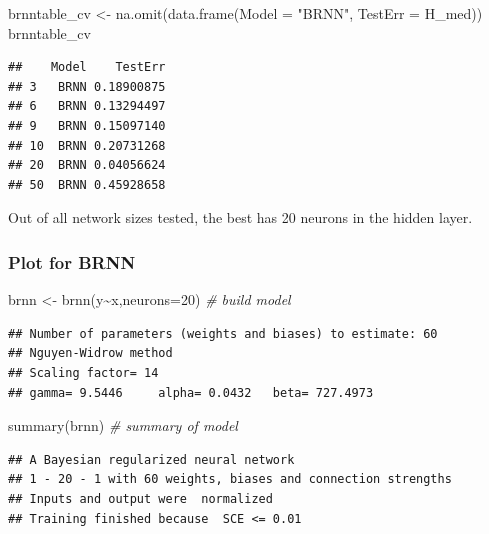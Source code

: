 \documentclass[
]{article}
\newenvironment{Shaded}{\begin{snugshade}}{\end{snugshade}}
\newcommand{\AttributeTok}[1]{\textcolor[rgb]{0.77,0.63,0.00}{#1}}
\newcommand{\CommentTok}[1]{\textcolor[rgb]{0.56,0.35,0.01}{\textit{#1}}}
\newcommand{\DecValTok}[1]{\textcolor[rgb]{0.00,0.00,0.81}{#1}}
\newcommand{\FunctionTok}[1]{\textcolor[rgb]{0.00,0.00,0.00}{#1}}
\newcommand{\NormalTok}[1]{#1}
\newcommand{\OtherTok}[1]{\textcolor[rgb]{0.56,0.35,0.01}{#1}}
\newcommand{\SpecialCharTok}[1]{\textcolor[rgb]{0.00,0.00,0.00}{#1}}
\newcommand{\StringTok}[1]{\textcolor[rgb]{0.31,0.60,0.02}{#1}}
\begin{document}
\begin{Shaded}
\begin{Highlighting}[]
\NormalTok{brnntable\_cv }\OtherTok{\textless{}{-}} \FunctionTok{na.omit}\NormalTok{(}\FunctionTok{data.frame}\NormalTok{(}\AttributeTok{Model =} \StringTok{"BRNN"}\NormalTok{, }\AttributeTok{TestErr =}\NormalTok{ H\_med))}
\NormalTok{brnntable\_cv}
\end{Highlighting}
\end{Shaded}

\begin{verbatim}
##    Model    TestErr
## 3   BRNN 0.18900875
## 6   BRNN 0.13294497
## 9   BRNN 0.15097140
## 10  BRNN 0.20731268
## 20  BRNN 0.04056624
## 50  BRNN 0.45928658
\end{verbatim}

Out of all network sizes tested, the best has 20 neurons in the hidden
layer.

\hypertarget{plot-for-brnn}{%
\subsubsection{Plot for BRNN}\label{plot-for-brnn}}

\begin{Shaded}
\begin{Highlighting}[]
\NormalTok{brnn }\OtherTok{\textless{}{-}} \FunctionTok{brnn}\NormalTok{(y}\SpecialCharTok{\textasciitilde{}}\NormalTok{x,}\AttributeTok{neurons=}\DecValTok{20}\NormalTok{)   }\CommentTok{\# build model}
\end{Highlighting}
\end{Shaded}

\begin{verbatim}
## Number of parameters (weights and biases) to estimate: 60 
## Nguyen-Widrow method
## Scaling factor= 14 
## gamma= 9.5446     alpha= 0.0432   beta= 727.4973
\end{verbatim}

\begin{Shaded}
\begin{Highlighting}[]
\FunctionTok{summary}\NormalTok{(brnn)                  }\CommentTok{\# summary of model}
\end{Highlighting}
\end{Shaded}

\begin{verbatim}
## A Bayesian regularized neural network 
## 1 - 20 - 1 with 60 weights, biases and connection strengths
## Inputs and output were  normalized
## Training finished because  SCE <= 0.01
\end{verbatim}
\end{document}
